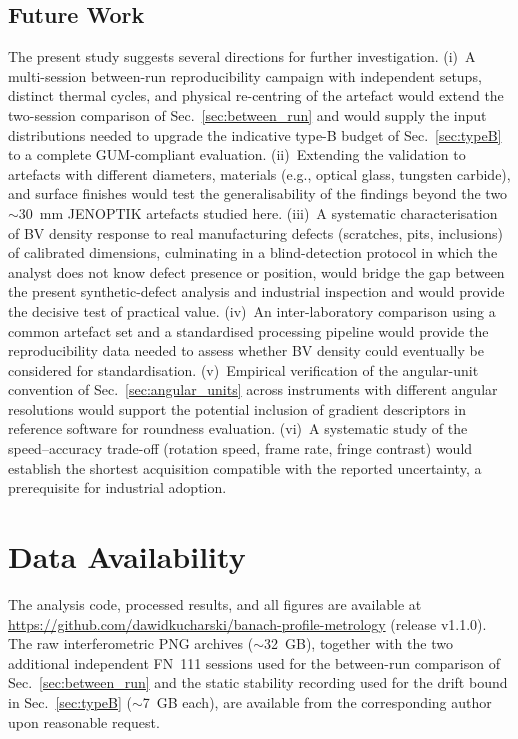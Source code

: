 \documentclass[review]{elsarticle}
\begin{document}
\subsection{Future Work}
\label{sec:future}
The present study suggests several directions for further investigation. (i)~A multi-session between-run reproducibility campaign with independent setups, distinct thermal cycles, and physical re-centring of the artefact would extend the two-session comparison of Sec.~\ref{sec:between_run} and would supply the input distributions needed to upgrade the indicative type-B budget of Sec.~\ref{sec:typeB} to a complete GUM-compliant evaluation. (ii)~Extending the validation to artefacts with different diameters, materials (e.g., optical glass, tungsten carbide), and surface finishes would test the generalisability of the findings beyond the two $\sim$30~mm JENOPTIK artefacts studied here. (iii)~A systematic characterisation of BV density response to real manufacturing defects (scratches, pits, inclusions) of calibrated dimensions, culminating in a blind-detection protocol in which the analyst does not know defect presence or position, would bridge the gap between the present synthetic-defect analysis and industrial inspection and would provide the decisive test of practical value. (iv)~An inter-laboratory comparison using a common artefact set and a standardised processing pipeline would provide the reproducibility data needed to assess whether BV density could eventually be considered for standardisation. (v)~Empirical verification of the angular-unit convention of Sec.~\ref{sec:angular_units} across instruments with different angular resolutions would support the potential inclusion of gradient descriptors in reference software for roundness evaluation. (vi)~A systematic study of the speed--accuracy trade-off (rotation speed, frame rate, fringe contrast) would establish the shortest acquisition compatible with the reported uncertainty, a prerequisite for industrial adoption.

\section*{Data Availability}
The analysis code, processed results, and all figures are available at \url{https://github.com/dawidkucharski/banach-profile-metrology} (release v1.1.0). The raw interferometric PNG archives ($\sim$32~GB), together with the two additional independent FN~111 sessions used for the between-run comparison of Sec.~\ref{sec:between_run} and the static stability recording used for the drift bound in Sec.~\ref{sec:typeB} ($\sim$7~GB each), are available from the corresponding author upon reasonable request.


\end{document}
